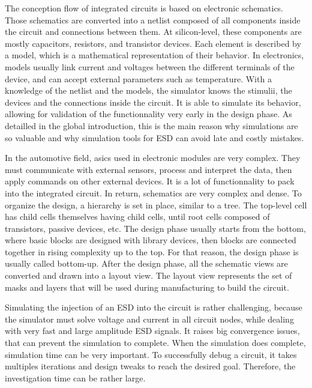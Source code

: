 The conception flow of integrated circuits is based on electronic schematics.
Those schematics are converted into a netlist composed of all components inside the circuit and connections between them.
At silicon-level, these components are mostly capacitors, resistors, and transistor devices.
Each element is described by a model, which is a mathematical representation of their behavior.
In electronics, models usually link current and voltages between the different terminals of the device, and can accept external parameters such as temperature.
With a knowledge of the netlist and the models, the simulator knows the stimulii, the devices and the connections inside the circuit.
It is able to simulate its behavior, allowing for validation of the functionnality very early in the design phase.
As detailled in the global introduction, this is the main reason why simulations are so valuable and why simulation tools for ESD can avoid late and costly mistakes.

In the automotive field, \gls{asic}s used in electronic modules are very complex.
They must communicate with external sensors, process and interpret the data, then apply commands on other external devices.
It is a lot of functionnality to pack into the integrated circuit.
In return, schematics are very complex and dense.
To organize the design, a hierarchy is set in place, similar to a tree.
The top-level cell has child cells themselves having child cells, until root cells composed of transistors, passive devices, etc.
The design phase usually starts from the bottom, where basic blocks are designed with library devices, then blocks are connected together in rising complexity up to the top.
For that reason, the design phase is usually called bottom-up.
After the design phase, all the schematic views are converted and drawn into a layout view.
The layout view represents the set of masks and layers that will be used during manufacturing to build the circuit.

Simulating the injection of an ESD into the circuit is rather challenging, because the simulator must solve voltage and current in all circuit nodes, while dealing with very fast and large amplitude ESD signals.
It raises big convergence issues, that can prevent the simulation to complete.
When the simulation does complete, simulation time can be very important.
To successfully debug a circuit, it takes multiples iterations and design tweaks to reach the desired goal.
Therefore, the investigation time can be rather large.

